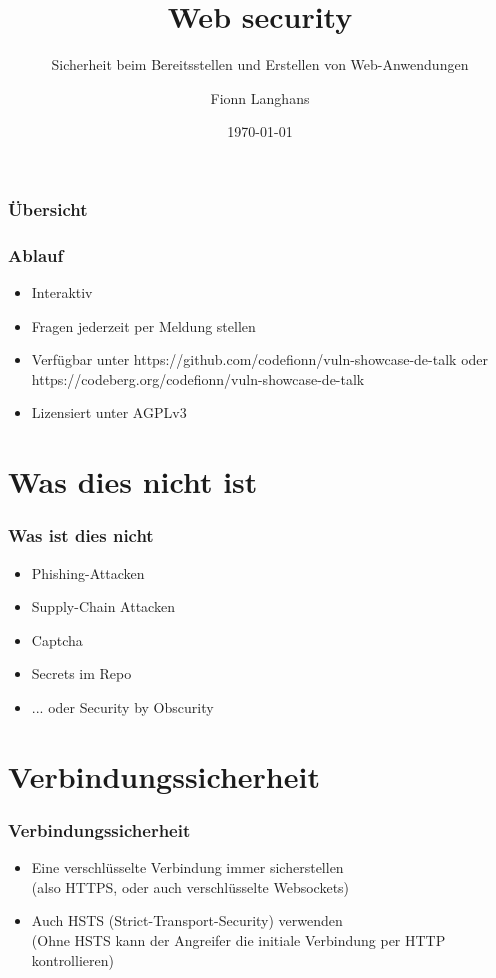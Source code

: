 \documentclass[ngerman2]{beamer}
\title{Web security}
\subtitle{Sicherheit beim Bereitsstellen und Erstellen von Web-Anwendungen}
\author{Fionn Langhans}
\date{\today}
\begin{document}
\frame{\titlepage}

\begin{frame}
\frametitle{Übersicht}
  \tableofcontents
\end{frame}

\begin{frame}[fragile]
\frametitle{Ablauf}
  \begin{itemize}
		\item Interaktiv
		\item Fragen jederzeit per Meldung stellen
    \item Verfügbar unter https://github.com/codefionn/vuln-showcase-de-talk
      oder https://codeberg.org/codefionn/vuln-showcase-de-talk
    \item Lizensiert unter AGPLv3 \cite{agplv3}
  \end{itemize}
\end{frame}

\section{Was dies nicht ist}

\begin{frame}[fragile]
\frametitle{Was ist dies nicht}
  \begin{itemize}
		\item Phishing-Attacken
		\item Supply-Chain Attacken
    \item Captcha
    \item Secrets im Repo
    \item ... oder Security by Obscurity
  \end{itemize}
\end{frame}

\section{Verbindungssicherheit}

\begin{frame}[fragile]
\frametitle{Verbindungssicherheit}
  \begin{itemize}
		\item Eine verschlüsselte Verbindung immer sicherstellen\\
      (also HTTPS, oder auch verschlüsselte Websockets)
		\item Auch HSTS (Strict-Transport-Security) verwenden\\
			(Ohne HSTS kann der Angreifer die initiale Verbindung per HTTP kontrollieren)
  \end{itemize}
\end{frame}
\end{document}
